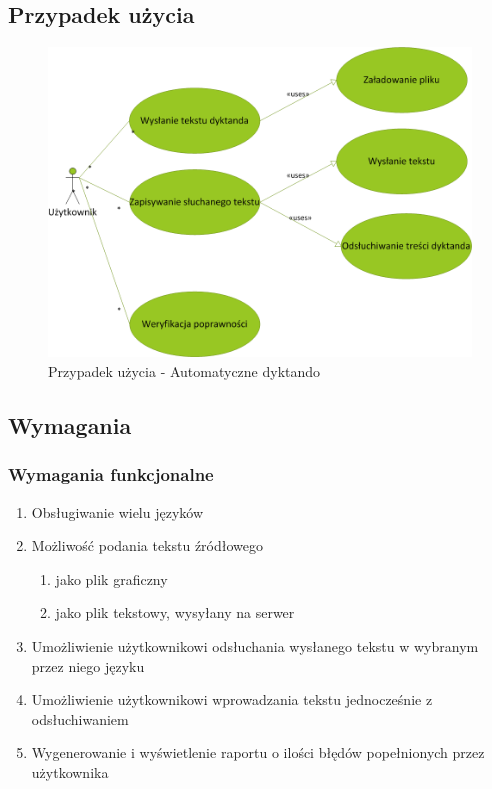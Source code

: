 \subsection{Przypadek użycia}
\begin{figure}[!h]
	\centering
	\includegraphics[scale=0.45]{useCaseDictando.png} 
	\caption{Przypadek użycia - Automatyczne dyktando }
\end{figure}

\subsection{Wymagania}
\subsubsection{Wymagania funkcjonalne}
\begin{enumerate}
	\item Obsługiwanie wielu języków
	\item Możliwość podania tekstu źródłowego
		\begin{enumerate}
			\item jako plik graficzny
			\item jako plik tekstowy, wysyłany na serwer
		\end{enumerate}
	\item Umożliwienie użytkownikowi odsłuchania wysłanego tekstu w wybranym przez niego języku
	\item Umożliwienie użytkownikowi wprowadzania tekstu jednocześnie z odsłuchiwaniem
	\item Wygenerowanie i wyświetlenie raportu o ilości błędów popełnionych przez użytkownika
\end{enumerate}

